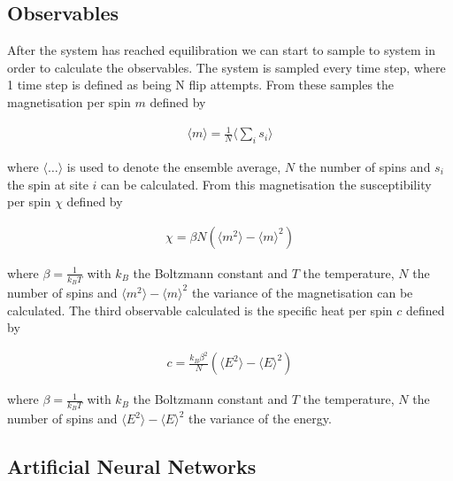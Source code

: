 \documentclass[10 pt, a4paper]{article}
\begin{document}
\subsection{Observables}

After the system has reached equilibration we can start to sample to system in order to calculate the observables. The system is sampled every time step, where 1 time step is defined as being N flip attempts. From these samples the magnetisation per spin $m$ defined by 

\begin{align}
\langle m \rangle = \frac{1}{N} \langle \sum_i s_i\rangle
\end{align}

where $\langle \dots \rangle$ is used to denote the ensemble average, $N$ the number of spins and $s_i$ the spin at site $i$ can be calculated. From this magnetisation the susceptibility per spin $\chi$ defined by

\begin{align}
\chi = \beta N \left( \langle m^2 \rangle - \langle m \rangle^2 \right)
\end{align}

where $\beta = \frac{1}{k_B T}$ with $k_B$ the Boltzmann constant and $T$ the temperature, $N$ the number of spins and $\langle m^2 \rangle - \langle m \rangle^2$ the variance of the magnetisation can be calculated. The third observable calculated is the specific heat per spin $c$ defined by

\begin{align}
c = \frac{k_B \beta^2}{N} \left( \langle E^2 \rangle - \langle E \rangle^2 \right)
\end{align}

where $\beta = \frac{1}{k_B T}$ with $k_B$ the Boltzmann constant and $T$ the temperature, $N$ the number of spins and $\langle E^2 \rangle - \langle E \rangle^2$ the variance of the energy.

\subsection{Artificial Neural Networks}
\end{document}
